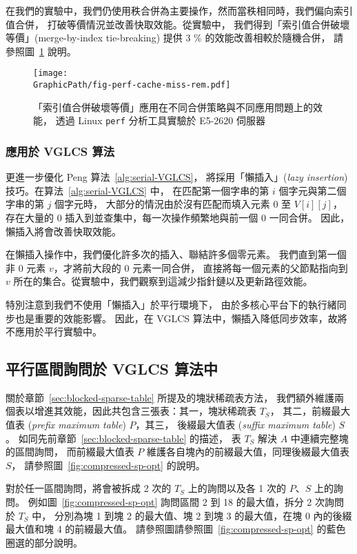 在我們的實驗中，我們仍使用秩合併為主要操作，然而當秩相同時，我們偏向索引值合併，
打破等價情況並改善快取效能。從實驗中，
我們得到「索引值合併破壞等價」(merge-by-index tie-breaking) 提供 3 \% 的效能改善相較於隨機合併，
請參照圖~\ref{fig:fig-perf-cache-miss-rem} 說明。

\begin{figure}
  \centering
  \texttt{[image: \\GraphicPath/fig-perf-cache-miss-rem.pdf]}
  \caption{「索引值合併破壞等價」應用在不同合併策略與不同應用問題上的效能，
  透過 Linux {\tt perf} 分析工具實驗於 E5-2620 伺服器}
  \label{fig:fig-perf-cache-miss-rem}
\end{figure}

\subsubsection{應用於 VGLCS 算法}


更進一步優化 Peng 算法~\ref{alg:serial-VGLCS}，
將採用「懶插入」({\em lazy insertion}) 技巧。在算法~\ref{alg:serial-VGLCS} 中，
在匹配第一個字串的第 $i$ 個字元與第二個字串的第 $j$ 個字元時，
大部分的情況由於沒有匹配而填入元素 $0$ 至 $V[i][j]$，
存在大量的 $0$ 插入到並查集中，每一次操作頻繁地與前一個 $0$ 一同合併。
因此，懶插入將會改善快取效能。

在懶插入操作中，我們優化許多次的插入、聯結許多個零元素。
我們直到第一個非 $0$ 元素 $v$，才將前大段的 $0$ 元素一同合併，
直接將每一個元素的父節點指向到 $v$ 所在的集合。從實驗中，我們觀察到這減少指針鏈以及更新路徑效能。

特別注意到我們不使用「懶插入」於平行環境下，
由於多核心平台下的執行緒同步也是重要的效能影響。
因此，在 VGLCS 算法中，懶插入降低同步效率，故將不應用於平行實驗中。

\subsection{平行區間詢問於 VGLCS 算法中}

關於章節~\ref{sec:blocked-sparse-table} 所提及的塊狀稀疏表方法，
我們額外維護兩個表以增進其效能，因此共包含三張表：其一，塊狀稀疏表 $T_S$，
其二，前綴最大值表 ({\em prefix maximum table}) $P$，其三，
後綴最大值表 ({\em suffix maximum table}) $S$。
如同先前章節~\ref{sec:blocked-sparse-table} 的描述，
表 $T_S$ 解決 $A$ 中連續完整塊的區間詢問，
而前綴最大值表 $P$ 維護各自塊內的前綴最大值，同理後綴最大值表 $S$，
請參照圖~\ref{fig:compressed-sp-opt} 的說明。

對於任一區間詢問，將會被拆成 2 次的 $T_S$ 上的詢問以及各 1 次的 $P$、$S$ 上的詢問。
例如圖~\ref{fig:compressed-sp-opt} 詢問區間 2 到 18 的最大值，拆分 2 次詢問於 $T_S$ 中，
分別為塊 1 到塊 2 的最大值、塊 2 到塊 3 的最大值，在塊 0 內的後綴最大值和塊 4 的前綴最大值。
請參照圖請參照圖~\ref{fig:compressed-sp-opt} 的藍色圈選的部分說明。

